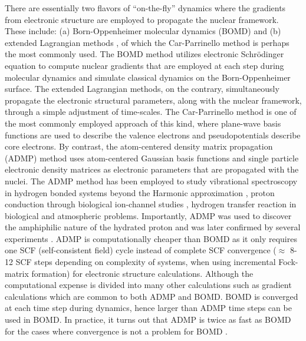There are essentially two flavors of ``on-the-fly'' dynamics where the gradients from
electronic structure are employed to propagate the nuclear framework. These include:
(a) Born-Oppenheimer molecular dynamics (BOMD) \cite{KarplusBO1, Leforestier-BO,
Helgaker-AIBO, BO-Hase, Hessian, bernyPESreview, Hrant-Berny-PESreview, formaldehyde,
pulay, CPchargedsystems} and (b) extended Lagrangian methods \cite{AndersenEL,
ParrinelloEL, Parrinello1984jcp-PI}, of which the Car-Parrinello method
\cite{CP, Madden, Marx-Cpreview, Cpdensity, Cptuckerman1, Cptuckerman3, Cpcpks, Carpar89,
Galli91, Parrinello-harmonic, Na+solv, NH4+solv, K+solv, SO3solv, Be2+solv, H+OH-solv,
Parrinello:ClH2O6, CarPar-Laasonen, CP-Wannier1, Marzari-Vanderbilt-Wannier, Kohn-Wannier,
CP-Gaussians1, CP-Gaussians2, CP-Gaussians-Martyna, Galli-mu-problem-BOCP, Galli-mu-problem,
carter1, carter2, carter3,Parrinello1984jcp-PI} is perhaps the
most commonly used. The BOMD method utilizes electronic Schr\"{o}dinger equation to
compute nuclear gradients that are employed at each step during molecular dynamics
and simulate classical dynamics on the Born-Oppenheimer surface. The extended Lagrangian
methods, on the contrary, simultaneously propagate the electronic structural
parameters, along with the nuclear framework, through a simple adjustment of
time-scales. The Car-Parrinello method is one of the most commonly employed approach
of this kind, where plane-wave basis functions are used to describe the valence
electrons and pseudopotentials describe core electrons. By contrast, the atom-centered
density matrix propagation (ADMP) \cite{admp1,admp2,admp3,admp4,IyengarFrisch,
IyengarSchlegelVoth} method uses atom-centered Gaussian basis functions and single
particle electronic density matrices as electronic parameters that are propagated
with the nuclei. The ADMP method has been employed to study vibrational spectroscopy
in hydrogen bonded systems beyond the Harmonic approximation
\cite{IyengarProtonatedWater1,IyengarProtonatedWater2,DietrickIyengar,LiTeigeIyengar,
LiOomensEyler,IyengarLiSumner}, proton conduction through biological ion-channel
studies \cite{RegaIyengar}, hydrogen transfer reaction in biological
\cite{SLO1-Rareevents} and atmospheric \cite{VimalPacheco,PachecoDietrick,
DietrickPachecoPhatak} problems. Importantly, ADMP was used to discover the
amphiphilic nature of the hydrated proton \cite{PetersenIyengar,IyengarDayVoth}
and was later confirmed by several experiments \cite{PetersenIyengar,IyengarDayVoth,
PetersenSaykally1,PetersenSaykally2,LeveringSierra,MuchaFrigato,KudinCar}. ADMP is
computationally cheaper than BOMD as it only requires one SCF (self-consistent field)
cycle instead of complete SCF convergence ($\approx$ 8-12 SCF steps depending on
complexity of systems, when using incremental Fock-matrix formation) for electronic
structure calculations. Although the computational expense is divided into many other
calculations such as gradient calculations which are common to both ADMP and BOMD. BOMD
is converged at each time step during dynamics, hence larger than ADMP time steps can
be used in BOMD. In practice, it turns out that ADMP is twice as fast as BOMD for the
cases where convergence is not a problem for BOMD \cite{BrorsenZahariev}.

